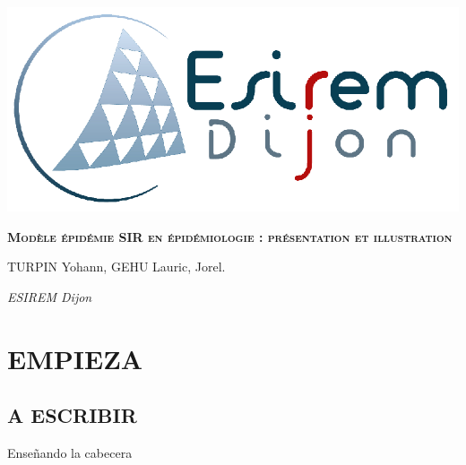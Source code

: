 \documentclass[11pt]{report}
\newcommand\blankpage{%
    \null
    \thispagestyle{empty}%
    \addtocounter{page}{-1}%
    \newpage}
\newcommand{\titulo}{\color{blue}Modèle épidémie SIR en épidémiologie : présentation et illustration}
\newcommand{\autor}{TURPIN Yohann, GEHU Lauric, Jorel.}
\newcommand{\fecha}{ESIREM Dijon}
\begin{document}
    \cfoot{\thepage}
    
    \begin{titlepage}
        \reversemarginpar{}
        
        {\centering
            \vspace{3cm} %
            \hspace{5cm} \includegraphics[width=.4\textwidth]{figs/Logo_Esirem.png} %
            \par\vspace{5cm}
            {\scshape\huge\textbf{\hspace{2cm}\titulo}} \par\vspace{6cm}
            
            {\LARGE
            \begin{flushright}
                    \item \autor 
                    \item \textit{\fecha}
            \end{flushright}
            }
        }
    \end{titlepage}

    \afterpage{\blankpage}
    
\begingroup
    \tableofcontents
\endgroup    
    \newpage
    \chapter{EMPIEZA}
        \section{A ESCRIBIR}
            \newpage Enseñando la cabecera
            
\end{document}
